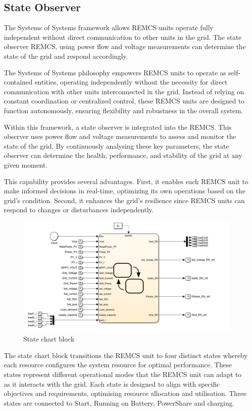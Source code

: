 \subsection{State Observer}
The Systems of Systems framework allows REMCS units operate fully independent without direct communication to other units in the grid. The state observer REMCS, using power flow and voltage measurements can determine the state of the grid and respond accordingly.\par
The Systems of Systems philosophy empowers REMCS units to operate as self-contained entities, operating independently without the necessity for direct communication with other units interconnected in the grid. Instead of relying on constant coordination or centralized control, these REMCS units are designed to function autonomously, ensuring flexibility and robustness in the overall system.\par
Within this framework, a state observer is integrated into the REMCS. This observer uses power flow and voltage measurements to assess and monitor the state of the grid. By continuously analysing these key parameters, the state observer can determine the health, performance, and stability of the grid at any given moment.\par
This capability provides several advantages. First, it enables each REMCS unit to make informed decisions in real-time, optimizing its own operations based on the grid's condition. Second, it enhances the grid's resilience since REMCS units can respond to changes or disturbances independently.\par
\begin{figure}[H]
	\centering
	\includegraphics[totalheight=8cm]{Figures/statechart block.png}
	\caption{State chart block}
\end{figure}
The state chart block transitions the REMCS unit to four distinct states whereby each resource configures the system resource for optimal performance. These states represent different operational modes that the REMCS unit can adapt to as it interacts with the grid. Each state is designed to align with specific objectives and requirements, optimising resource allocation and utilisation. Three states are connected to Start, Running on Battery, PowerShare and charging.\par
